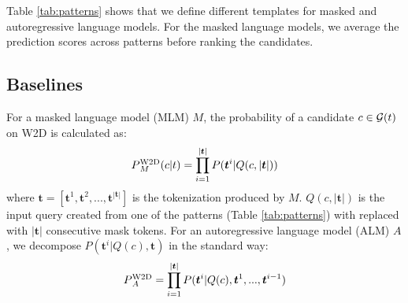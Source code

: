 \documentclass[11pt,a4paper]{article}
\def\uprm#1#2{\mbox{$_#2^{\hbox{\scriptsize #1}}$}}
\begin{document}
Table \ref{tab:patterns} shows that we define different templates for masked and autoregressive language models.
For the masked language models, we average the prediction scores across patterns before ranking the candidates.



\subsection{Baselines}

  

For a masked language model (MLM)
$M$, the probability of a candidate $c \in {\cal G}(t)$ on W2D  is calculated as:
\begin{equation*}
  P\uprm{W2D}{M} (c|t) = \prod_{i=1}^{|\bm{t}|}P(\bm{t}^i|Q(c,|\bm{t}|))
\end{equation*}
where $\bm{t} = [\bm{t}^1, \bm{t}^2,...,\bm{t}^{|\bm{t}|}]$
is the tokenization produced by  $M$. $Q(c,|\bm{t}|)$ is the
input query
created from one of the patterns (Table \ref{tab:patterns})
with \underline{\hspace{3mm}} replaced with
$|\bm{t}|$ consecutive mask tokens. For an autoregressive
language model (ALM) $A$, we
decompose $P(\bm{t}^i|Q(c),\bm{t})$ in the standard way:
\begin{equation*}
    P\uprm{W2D}{A} = \prod_{i=1}^{|\bm{t}|}P(\bm{t}^i|Q(c),\bm{t}^{1},...,\bm{t}^{i-1})
\end{equation*}
\end{document}
